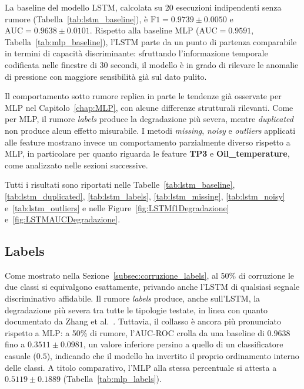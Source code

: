 \documentclass[../main.tex]{subfiles}
\begin{document}
La baseline del modello LSTM, calcolata su 20 esecuzioni indipendenti senza rumore (Tabella~\ref{tab:lstm_baseline}), è $\text{F1} = 0.9739 \pm 0.0050$ e $\text{AUC} = 0.9638 \pm 0.0101$. Rispetto alla baseline MLP ($\text{AUC} = 0.9591$, Tabella~\ref{tab:mlp_baseline}), l'LSTM parte da un punto di partenza comparabile in termini di capacità discriminante: sfruttando l'informazione temporale codificata nelle finestre di 30 secondi, il modello è in grado di rilevare le anomalie di pressione con maggiore sensibilità già sul dato pulito.

Il comportamento sotto rumore replica in parte le tendenze già osservate per MLP nel Capitolo~\ref{chap:MLP}, con alcune differenze strutturali rilevanti. Come per MLP, il rumore \textit{labels} produce la degradazione più severa, mentre \textit{duplicated} non produce alcun effetto misurabile. I metodi \textit{missing}, \textit{noisy} e \textit{outliers} applicati alle feature mostrano invece un comportamento parzialmente diverso rispetto a MLP, in particolare per quanto riguarda le feature \textbf{TP3} e \textbf{Oil\_temperature}, come analizzato nelle sezioni successive.

Tutti i risultati sono riportati nelle Tabelle~\ref{tab:lstm_baseline}, \ref{tab:lstm_duplicated}, \ref{tab:lstm_labels}, \ref{tab:lstm_missing}, \ref{tab:lstm_noisy} e~\ref{tab:lstm_outliers} e nelle Figure~\ref{fig:LSTMf1Degradazione} e~\ref{fig:LSTMAUCDegradazione}.

\newpage

\subsection{Labels}
Come mostrato nella Sezione~\ref{subsec:corruzione_labels}, al 50\% di corruzione le due classi si equivalgono esattamente, privando anche l'LSTM di qualsiasi segnale discriminativo affidabile. Il rumore \textit{labels} produce, anche sull'LSTM, la degradazione più severa tra tutte le tipologie testate, in linea con quanto documentato da Zhang et al.~\cite{zhang2017understandingdeeplearningrequires}. Tuttavia, il collasso è ancora più pronunciato rispetto a MLP: a 50\% di rumore, l'AUC-ROC crolla da una baseline di $0.9638$ fino a $\mathbf{0.3511 \pm 0.0981}$, un valore inferiore persino a quello di un classificatore casuale ($0.5$), indicando che il modello ha invertito il proprio ordinamento interno delle classi. A titolo comparativo, l'MLP alla stessa percentuale si attesta a $0.5119 \pm 0.1889$ (Tabella~\ref{tab:mlp_labels}).
\end{document}
